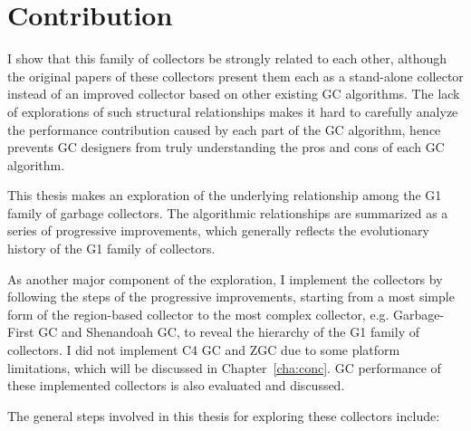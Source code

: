 

\section{Contribution}

I show that this family of collectors be strongly related to each other,
although the original papers of these collectors present them each as a stand-alone collector
instead of an improved collector based on other existing GC algorithms. The lack of
explorations of such structural relationships makes it hard to carefully analyze
the performance contribution caused by each part of the GC algorithm, hence prevents
GC designers from truly understanding the pros and cons of each GC algorithm.

This thesis makes an exploration of the underlying relationship among the
G1 family of garbage collectors. The algorithmic relationships are summarized
as a series of progressive improvements, which generally reflects the evolutionary
history of the G1 family of collectors.

As another major component of the exploration, I implement the collectors by following
the steps of the progressive improvements, starting from a most simple form of the
region-based collector to the most complex collector, e.g. Garbage-First GC and
Shenandoah GC, to reveal the hierarchy of the G1 family of collectors.
I did not implement C4 GC and ZGC due to some platform limitations, which will be
discussed in Chapter~\ref{cha:conc}.
GC performance of these implemented collectors is also evaluated and discussed.

The general steps involved in this thesis for exploring these collectors include:

